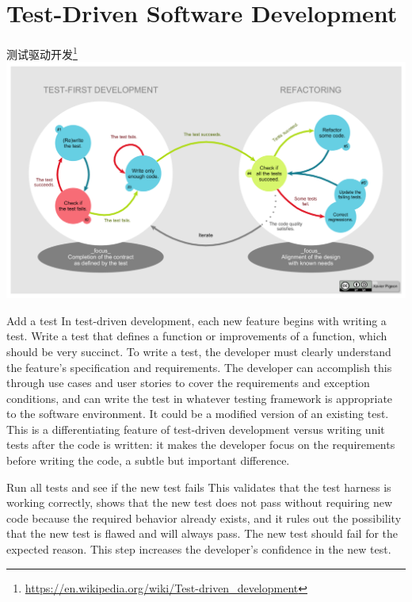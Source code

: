 \documentclass{beamer}
\begin{document}
\section{Test-Driven Software Development}

\begin{frame}[t]{测试驱动开发\footnote{\url{https://en.wikipedia.org/wiki/Test-driven_development}}}
    \includegraphics[width=0.8\linewidth]{images/TDD-Global-Lifecycle.png}
    
\end{frame}

\begin{frame}[t]{Add a test}
In test-driven development, each new feature begins with writing a test. Write a test that defines a function or improvements of a function, which should be very succinct. To write a test, the developer must clearly understand the feature's specification and requirements. The developer can accomplish this through use cases and user stories to cover the requirements and exception conditions, and can write the test in whatever testing framework is appropriate to the software environment. It could be a modified version of an existing test. This is a differentiating feature of test-driven development versus writing unit tests after the code is written: it makes the developer focus on the requirements before writing the code, a subtle but important difference.
    
\end{frame}


\begin{frame}[t]{Run all tests and see if the new test fails}
This validates that the test harness is working correctly, shows that the new test does not pass without requiring new code because the required behavior already exists, and it rules out the possibility that the new test is flawed and will always pass. The new test should fail for the expected reason. This step increases the developer's confidence in the new test.
    
\end{frame}
\end{document}
